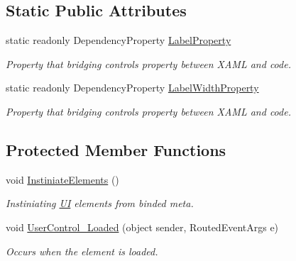 \subsection*{Static Public Attributes}
\begin{DoxyCompactItemize}
\item 
static readonly Dependency\+Property \mbox{\hyperlink{class_wpf_handler_1_1_u_i_1_1_controls_1_1_flat_toggles_group_a72591a66a8b72130cf16e966bbed5507}{Label\+Property}}
\begin{DoxyCompactList}\small\item\em Property that bridging control\textquotesingle{}s property between X\+A\+ML and code. \end{DoxyCompactList}\item 
static readonly Dependency\+Property \mbox{\hyperlink{class_wpf_handler_1_1_u_i_1_1_controls_1_1_flat_toggles_group_acd4cc98db2da7479ac81dd03ceaadcae}{Label\+Width\+Property}}
\begin{DoxyCompactList}\small\item\em Property that bridging control\textquotesingle{}s property between X\+A\+ML and code. \end{DoxyCompactList}\end{DoxyCompactItemize}
\subsection*{Protected Member Functions}
\begin{DoxyCompactItemize}
\item 
void \mbox{\hyperlink{class_wpf_handler_1_1_u_i_1_1_controls_1_1_flat_toggles_group_a58a008dadfd937ce1379ee16602139bd}{Instiniate\+Elements}} ()
\begin{DoxyCompactList}\small\item\em Instiniating \mbox{\hyperlink{namespace_wpf_handler_1_1_u_i}{UI}} elements from binded meta. \end{DoxyCompactList}\item 
void \mbox{\hyperlink{class_wpf_handler_1_1_u_i_1_1_controls_1_1_flat_toggles_group_a8e8bd8928ac0cba35f35554adad3f077}{User\+Control\+\_\+\+Loaded}} (object sender, Routed\+Event\+Args e)
\begin{DoxyCompactList}\small\item\em Occurs when the element is loaded. \end{DoxyCompactList}\end{DoxyCompactItemize}
